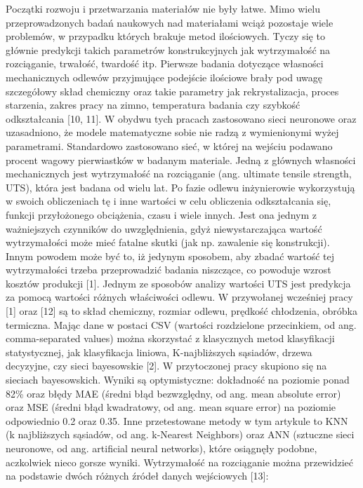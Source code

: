 Początki rozwoju i przetwarzania materiałów nie były łatwe. Mimo wielu przeprowadzonych badań naukowych nad materiałami wciąż pozostaje wiele problemów, w przypadku których brakuje metod ilościowych. Tyczy się to głównie predykcji takich parametrów konstrukcyjnych jak wytrzymałość na rozciąganie, trwałość, twardość itp. Pierwsze badania dotyczące własności mechanicznych odlewów przyjmujące podejście ilościowe brały pod uwagę szczegółowy skład chemiczny oraz takie parametry jak rekrystalizacja, proces starzenia, zakres pracy na zimno, temperatura badania czy szybkość odkształcania [10, 11]. W obydwu tych pracach zastosowano sieci neuronowe oraz uzasadniono, że modele matematyczne sobie nie radzą z wymienionymi wyżej parametrami. Standardowo zastosowano sieć, w której na wejściu podawano procent wagowy pierwiastków w badanym materiale. 
Jedną z głównych własności mechanicznych jest wytrzymałość na rozciąganie (ang. ultimate tensile strength, UTS), która jest badana od wielu lat. Po fazie odlewu inżynierowie wykorzystują w swoich obliczeniach tę i inne wartości w celu obliczenia odkształcania się, funkcji przyłożonego obciążenia, czasu i wiele innych. Jest ona jednym z ważniejszych czynników do uwzględnienia, gdyż niewystarczająca wartość wytrzymałości może mieć fatalne skutki (jak np. zawalenie się konstrukcji). Innym powodem może być to, iż jedynym sposobem, aby zbadać wartość tej wytrzymałości trzeba przeprowadzić badania niszczące, co powoduje wzrost kosztów produkcji [1]. Jednym ze sposobów analizy wartości UTS jest predykcja za pomocą wartości różnych właściwości odlewu. W przywołanej wcześniej pracy [1] oraz [12] są to skład chemiczny, rozmiar odlewu, prędkość chłodzenia, obróbka termiczna. Mając dane w postaci CSV (wartości rozdzielone przecinkiem, od ang. comma-separated values) można skorzystać z klasycznych metod klasyfikacji statystycznej, jak klasyfikacja liniowa, K-najbliższych sąsiadów, drzewa decyzyjne, czy sieci bayesowskie [2]. W przytoczonej pracy skupiono się na sieciach bayesowskich. Wyniki są optymistyczne: dokładność na poziomie ponad 82\% oraz błędy MAE (średni błąd bezwzględny, od ang. mean absolute error) oraz MSE (średni błąd kwadratowy, od ang. mean square error) na poziomie odpowiednio 0.2 oraz 0.35. Inne przetestowane metody w tym artykule to KNN (k najbliższych sąsiadów, od ang. k-Nearest Neighbors) oraz ANN (sztuczne sieci neuronowe, od ang. artificial neural networks), które osiągnęły podobne, aczkolwiek nieco gorsze wyniki. 
Wytrzymałość na rozciąganie można przewidzieć na podstawie dwóch różnych źródeł danych wejściowych [13]:


